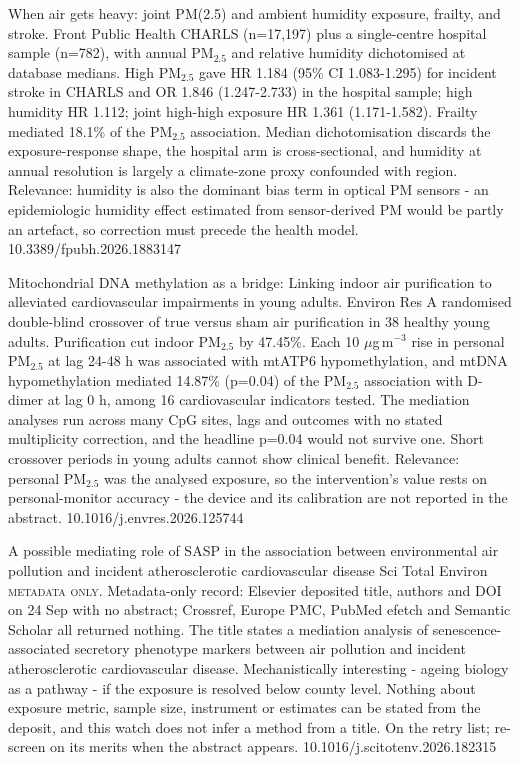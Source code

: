 \documentclass[10pt]{article}
\begin{document}
{When air gets heavy: joint PM(2.5) and ambient humidity exposure, frailty, and stroke.}
{Front Public Health}
{CHARLS (n=17,197) plus a single-centre hospital sample (n=782), with annual PM$_{2.5}$ and relative humidity dichotomised at database medians. High PM$_{2.5}$ gave HR 1.184 (95\% CI 1.083-1.295) for incident stroke in CHARLS and OR 1.846 (1.247-2.733) in the hospital sample; high humidity HR 1.112; joint high-high exposure HR 1.361 (1.171-1.582). Frailty mediated 18.1\% of the PM$_{2.5}$ association. Median dichotomisation discards the exposure-response shape, the hospital arm is cross-sectional, and humidity at annual resolution is largely a climate-zone proxy confounded with region. Relevance: humidity is also the dominant bias term in optical PM sensors - an epidemiologic humidity effect estimated from sensor-derived PM would be partly an artefact, so correction must precede the health model.}
{10.3389/fpubh.2026.1883147}

{Mitochondrial DNA methylation as a bridge: Linking indoor air purification to alleviated cardiovascular impairments in young adults.}
{Environ Res}
{A randomised double-blind crossover of true versus sham air purification in 38 healthy young adults. Purification cut indoor PM$_{2.5}$ by 47.45\%. Each 10 $\mu$g\,m$^{-3}$ rise in personal PM$_{2.5}$ at lag 24-48 h was associated with mtATP6 hypomethylation, and mtDNA hypomethylation mediated 14.87\% (p=0.04) of the PM$_{2.5}$ association with D-dimer at lag 0 h, among 16 cardiovascular indicators tested. The mediation analyses run across many CpG sites, lags and outcomes with no stated multiplicity correction, and the headline p=0.04 would not survive one. Short crossover periods in young adults cannot show clinical benefit. Relevance: personal PM$_{2.5}$ was the analysed exposure, so the intervention's value rests on personal-monitor accuracy - the device and its calibration are not reported in the abstract.}
{10.1016/j.envres.2026.125744}

{A possible mediating role of SASP in the association between environmental air pollution and incident atherosclerotic cardiovascular disease}
{Sci Total Environ}
{\textsc{metadata only.} Metadata-only record: Elsevier deposited title, authors and DOI on 24 Sep with no abstract; Crossref, Europe PMC, PubMed efetch and Semantic Scholar all returned nothing. The title states a mediation analysis of senescence-associated secretory phenotype markers between air pollution and incident atherosclerotic cardiovascular disease. Mechanistically interesting - ageing biology as a pathway - if the exposure is resolved below county level. Nothing about exposure metric, sample size, instrument or estimates can be stated from the deposit, and this watch does not infer a method from a title. On the retry list; re-screen on its merits when the abstract appears.}
{10.1016/j.scitotenv.2026.182315}
\end{document}
